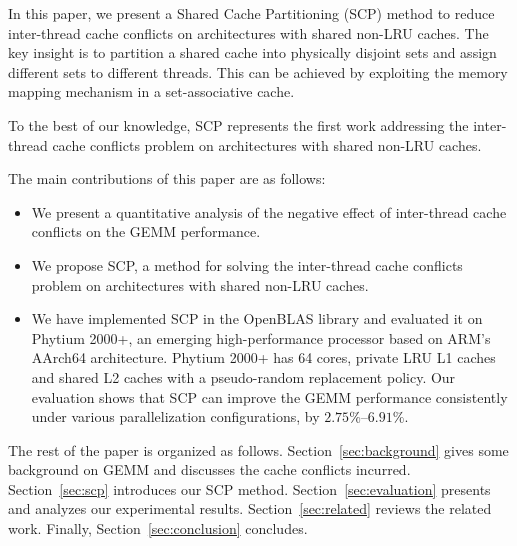 In this paper, we present a Shared Cache Partitioning (SCP) method
to reduce inter-thread cache conflicts on architectures with shared non-LRU caches.
The key insight is to partition a
shared cache into physically disjoint sets
and assign different sets to different threads. This can be achieved by
exploiting the memory mapping mechanism in a 
set-associative cache.

To the best of our knowledge, SCP represents
the first work addressing
the inter-thread cache conflicts problem on
architectures with shared non-LRU caches.

The main contributions of this paper are as follows:
\begin{itemize}
\item We present a quantitative analysis of the negative effect of inter-thread cache
  conflicts on the GEMM performance.
\item We propose SCP, a method for solving the inter-thread cache conflicts
  problem on architectures with shared non-LRU caches.
\item We have implemented SCP in the OpenBLAS library and evaluated it on Phytium 2000+,
  an emerging high-performance processor based on ARM's AArch64 architecture.
  Phytium 2000+ has 64 cores, private LRU L1 caches
  and shared L2 caches with a pseudo-random
  replacement policy.
  Our evaluation shows that SCP can improve the GEMM performance consistently
  under various parallelization configurations, by $2.75\%$--$6.91\%$.
\end{itemize}


The rest of the paper is organized as follows.
Section~\ref{sec:background} gives some background on GEMM and discusses
the cache conflicts incurred.
Section~\ref{sec:scp} introduces our SCP method.
Section~\ref{sec:evaluation} presents and
analyzes our experimental results.
Section~\ref{sec:related} reviews the related work.
Finally, Section~\ref{sec:conclusion} concludes.
